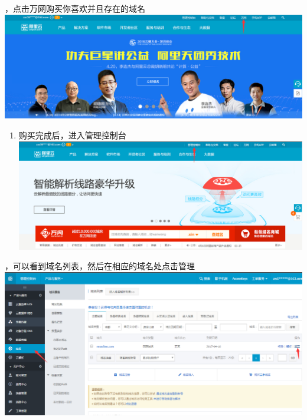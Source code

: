 \documentclass{article}
\begin{document}
\begin{enumerate}[noitemsep,topsep=\mdcompacttopsep,start=2]%

，点击万网购买你喜欢并且存在的域名
\includegraphics[keepaspectratio=true,width=\dimmin{}{\dimwidth{0.90}}]{images/4}{}%
\end{enumerate}%

\begin{enumerate}[noitemsep,topsep=\mdcompacttopsep,start=3]%

\item{}
购买完成后，进入管理控制台
\includegraphics[keepaspectratio=true,width=\dimmin{}{\dimwidth{0.90}}]{images/5}{}%
\end{enumerate}%

\begin{enumerate}[noitemsep,topsep=\mdcompacttopsep,start=4]%

，可以看到域名列表，然后在相应的域名处点击管理
\includegraphics[keepaspectratio=true,width=\dimmin{}{\dimwidth{0.90}}]{images/6}{}%
\end{enumerate}%
\end{document}
